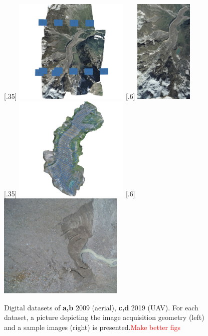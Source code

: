 \begin{figure}[ht]
    \centering
    \subcaptionbox{\label{fig:2:datasets_digital:2009_block}}[.35\textwidth]{
        \includegraphics[height=5cm]{2009_block} \hfill
    } 
    \subcaptionbox{\label{fig:2:datasets_digital:2009_img}}[.6\textwidth]{
        \includegraphics[height=5cm]{2009_img}
    } \\
    \subcaptionbox{\label{fig:2:datasets_digital:2019_block}}[.35\textwidth]{
        \includegraphics[height=5cm]{2019_block} \hfill
    } 
    \subcaptionbox{\label{fig:2:datasets_digital:2019_img}}[.6\textwidth]{
        \includegraphics[height=5cm]{2019_img}
    } \\
    \caption{Digital datasets of \textbf{a,b} 2009 (aerial), \textbf{c,d} 2019 (UAV). For each dataset, a picture depicting the image acquisition geometry (left) and a sample images (right) is presented.\textcolor{red}{Make better figs}}
    \label{fig:2:datasets_digital}
\end{figure}


